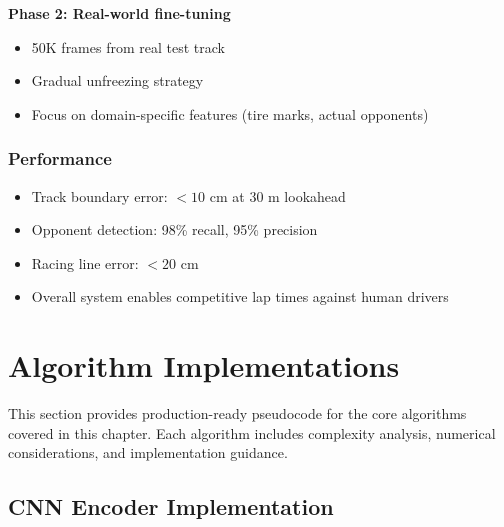 \textbf{Phase 2: Real-world fine-tuning}
\begin{itemize}
    \item 50K frames from real test track
    \item Gradual unfreezing strategy
    \item Focus on domain-specific features (tire marks, actual opponents)
\end{itemize}

\subsubsection{Performance}

\begin{itemize}
    \item Track boundary error: $< 10$ cm at 30 m lookahead
    \item Opponent detection: 98\% recall, 95\% precision
    \item Racing line error: $< 20$ cm
    \item Overall system enables competitive lap times against human drivers
\end{itemize}

\section{Algorithm Implementations}
\label{sec:algorithm_implementations}

This section provides production-ready pseudocode for the core algorithms covered in this chapter. Each algorithm includes complexity analysis, numerical considerations, and implementation guidance.

\subsection{CNN Encoder Implementation}

